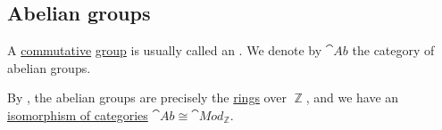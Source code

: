 \subsection{Abelian groups}\label{subsec:abelian_groups}

\begin{definition}\label{def:abelian_group}
  A \hyperref[def:magma/commutative]{commutative} \hyperref[def:group]{group} is usually called an . We denote by \( \cat{Ab} \) the category of abelian groups.

  By , the abelian groups are precisely the \hyperref[def:algebra_over_ring]{rings} over \( \BbbZ \), and we have an \hyperref[rem:category_similarity/isomorphism]{isomorphism of categories} \( \cat{Ab} \cong \cat{Mod}_\BbbZ \).
\end{definition}

